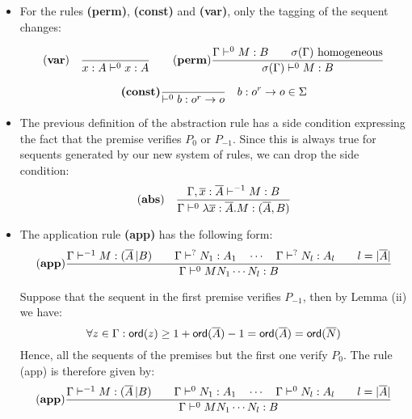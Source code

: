 \begin{itemize}
\item  For the rules \textbf{(perm)}, \textbf{(const)} and \textbf{(var)}, only the tagging of the sequent changes:

$$ \mathbf{(var)} \quad  \frac{\displaystyle }{x : A\vdash^{0} x : A}
\qquad
  (\mbox{\textbf{perm}}) {
      { \Gamma \vdash^0 M:B \qquad \sigma(\Gamma)  } \hbox{ homogeneous}
    \over
      { \sigma(\Gamma) \vdash^0 M : B }
    }
$$

\[ \textbf{(const)}
    { \over { \vdash^0 b : o^r \rightarrow o}} \quad b : o^r \rightarrow o \in \Sigma
    \]

\item  The previous definition of the abstraction rule has a side condition
expressing the fact that the premise verifies $P_0$ or $P_{-1}$. Since this is always true for sequents
generated by our new system of rules, we can drop the side condition:
$$ \mathbf{(abs)} \quad  \frac{\displaystyle \Gamma, \overline{x} : \overline{A} \vdash^{-1} M : B}{\Gamma  \vdash^{0} \lambda \overline{x} : \overline{A} . M : (\overline{A},B)}$$


\item The application rule \textbf{(app)} has the following form:
\[ (\mbox{\textbf{app}})
    {
        { \Gamma \vdash^{-1} M : (\overline{A} \, | B)
        \qquad
        \Gamma \vdash^? N_1 : A_1 \quad \cdots \quad \Gamma \vdash^? N_{l} : A_l \qquad l = |\overline{A}|
        }
    \over{
        \Gamma \vdash^0 M N_1 \cdots N_{l} : B
       }
    }
\]

Suppose that the sequent in the first premise verifies $P_{-1}$, then by Lemma \label{lem:safe_basic_prop}(ii)
we have:
$$\forall z \in \Gamma : {\sf ord}(z) \geq 1 + {\sf ord}(\overline{A}) -1 = {\sf ord}(\overline{A}) = {\sf ord}(\overline{N})$$
Hence, all the sequents of the premises but the first one verify $P_0$. The rule (app) is therefore given by:
\[ (\mbox{\textbf{app}})
    {
        { \Gamma \vdash^{-1} M : (\overline{A} \, | B)
        \qquad
        \Gamma \vdash^0 N_1 : A_1 \quad \cdots \quad \Gamma \vdash^0 N_{l} : A_l \qquad l = |\overline{A}|
        }
    \over{
        \Gamma \vdash^0 M N_1 \cdots N_{l} : B
       }
    }
\]


\end{itemize}
